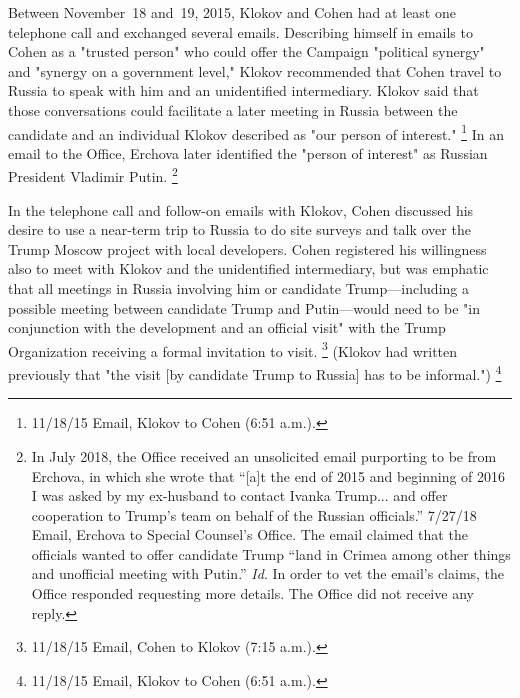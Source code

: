 Between November~18 and~19, 2015, Klokov and Cohen had at least one telephone call and exchanged several emails.
Describing himself in emails to Cohen as a "trusted person" who could offer the Campaign "political synergy" and "synergy on a government level," Klokov recommended that Cohen travel to Russia to speak with him and an unidentified intermediary.
Klokov said that those conversations could facilitate a later meeting in Russia between the candidate and an individual Klokov described as "our person of interest."%
\footnote{11/18/15 Email, Klokov to Cohen (6:51 a.m.).}
In an email to the Office, Erchova later identified the "person of interest" as Russian President Vladimir Putin.%
\footnote{In July 2018, the Office received an unsolicited email purporting to be from Erchova, in which she wrote that “[a]t the end of 2015 and beginning of 2016 I was asked by my ex-husband to contact Ivanka Trump... and offer cooperation to Trump's team on behalf of the Russian officials.”
7/27/18 Email, Erchova to Special Counsel's Office.
The email claimed that the officials wanted to offer candidate Trump “land in Crimea among other things and unofficial meeting with Putin.”
\textit{Id}.
In order to vet the email's claims, the Office responded requesting more details.
The Office did not receive any reply.}

In the telephone call and follow-on emails with Klokov, Cohen discussed his desire to use a near-term trip to Russia to do site surveys and talk over the Trump Moscow project with local developers.
Cohen registered his willingness also to meet with Klokov and the unidentified intermediary, but was emphatic that all meetings in Russia involving him or candidate Trump---including a possible meeting between candidate Trump and Putin---would need to be "in conjunction with the development and an official visit" with the Trump Organization receiving a formal invitation to visit.%
\footnote{11/18/15 Email, Cohen to Klokov (7:15 a.m.).}
(Klokov had written previously that "the visit [by candidate Trump to Russia] has to be informal.")%
\footnote{11/18/15 Email, Klokov to Cohen (6:51 a.m.).}

